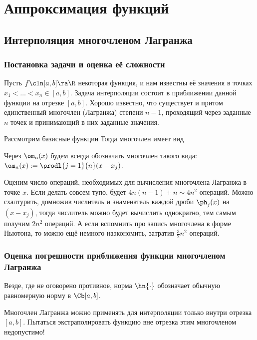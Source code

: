 \documentclass[a4paper]{article}
\begin{document}
\pagebreak

\section{Аппроксимация функций}

\subsection{Интерполяция многочленом Лагранжа}

\subsubsection{Постановка задачи и оценка её сложности}

Пусть $f\cln[a,b]\ra \R$ некоторая функция, и нам известны её значения
в точках $x_1<\dots< x_n\in [a,b]$. Задача интерполяции состоит в
приближении данной функции на отрезке $[a,b]$. Хорошо известно, что
существует и притом единственный многочлен (Лагранжа) степени $n-1$,
проходящий через заданные $n$ точек и принимающий в них заданные
значения.

Рассмотрим базисные функции 
Тогда многочлен имеет вид 

Через $\om_n(x)$ будем всегда обозначать многочлен такого вида:
$\om_n(x) := \prodl{j=1}{n}(x-x_j)$.

Оценим число операций, необходимых для вычисления многочлена Лагранжа
в точке $x$. Если делать совсем тупо, будет $4n(n-1)+n \sim 4 n^2$
операций. Можно схалтурить, домножив числитель и знаменатель каждой
дроби $\ph_j(x)$ на $(x-x_j)$, тогда числитель можно будет вычислить
однократно, тем самым получим $2n^2$ операций. А если вспомнить про
запись многочлена в форме Ньютона, то можно ещё немного наэкономить,
затратив $\frac32n^2$ операций.

\subsubsection{Оценка погрешности приближения функции многочленом Лагранжа}

Везде, где не оговорено противное, норма $\hn{\cdot}$ обозначает
обычную равномерную норму в $\Cb[a,b]$.

\begin{note}
Многочлен Лагранжа можно применять для интерполяции только внутри
отрезка $[a,b]$.  Пытаться экстраполировать функцию вне отрезка этим
многочленом недопустимо!
\end{note}
\end{document}
